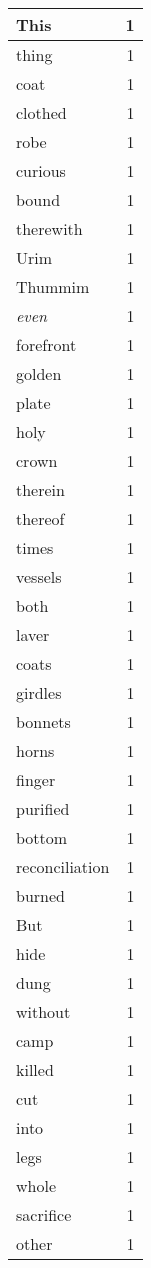 \begin{center}
\begin{longtable}{l|r}
This & 1 \\ \hline
thing & 1 \\ \hline
coat & 1 \\ \hline
clothed & 1 \\ \hline
robe & 1 \\ \hline
curious & 1 \\ \hline
bound & 1 \\ \hline
therewith & 1 \\ \hline
Urim & 1 \\ \hline
Thummim & 1 \\ \hline
\emph{even} & 1 \\ \hline
forefront & 1 \\ \hline
golden & 1 \\ \hline
plate & 1 \\ \hline
holy & 1 \\ \hline
crown & 1 \\ \hline
therein & 1 \\ \hline
thereof & 1 \\ \hline
times & 1 \\ \hline
vessels & 1 \\ \hline
both & 1 \\ \hline
laver & 1 \\ \hline
coats & 1 \\ \hline
girdles & 1 \\ \hline
bonnets & 1 \\ \hline
horns & 1 \\ \hline
finger & 1 \\ \hline
purified & 1 \\ \hline
bottom & 1 \\ \hline
reconciliation & 1 \\ \hline
burned & 1 \\ \hline
But & 1 \\ \hline
hide & 1 \\ \hline
dung & 1 \\ \hline
without & 1 \\ \hline
camp & 1 \\ \hline
killed & 1 \\ \hline
cut & 1 \\ \hline
into & 1 \\ \hline
legs & 1 \\ \hline
whole & 1 \\ \hline
sacrifice & 1 \\ \hline
other & 1 \\ \hline

\end{longtable}
\end{center}
